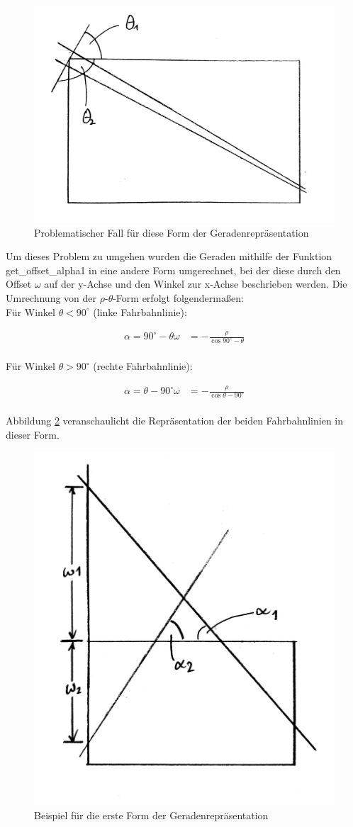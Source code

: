 	
	
	\begin{figure}[H]
		\centering
		\includegraphics[width=.5\linewidth]{images/rho_theta2.jpg}
		\caption{Problematischer Fall für diese Form der Geradenrepräsentation}
		\label{fig:rho_theta2}
	\end{figure}

	Um dieses Problem zu umgehen wurden die Geraden mithilfe der Funktion get\_offset\_alpha1 in eine andere Form umgerechnet, bei der diese durch den Offset $\omega$ auf der y-Achse und den Winkel zur x-Achse beschrieben werden. Die Umrechnung von der $\rho$-$\theta$-Form erfolgt folgendermaßen:\\

	
	
	Für Winkel $\theta<90^\circ$ (linke Fahrbahnlinie):
	
	\begin{align*}
	\alpha=90^{\circ}-\theta
	\omega&=-\frac{\rho}{\cos{90^{\circ}-\theta}} \\
	\end{align*}
	
	Für Winkel $\theta>90^\circ$ (rechte Fahrbahnlinie):
	
	\begin{align*}
	\alpha=\theta-90^{\circ}
	\omega&=-\frac{\rho}{\cos{\theta-90^{\circ}}} \\
	\end{align*}
	
	Abbildung \ref{fig:alpha_omega1} veranschaulicht die Repräsentation der beiden Fahrbahnlinien in dieser Form.
	
	\begin{figure}[H]
		\centering
		\includegraphics[width=.5\linewidth]{images/alpha_omega1.jpg}
		\caption{Beispiel für die erste Form der Geradenrepräsentation}
		\label{fig:alpha_omega1}
	\end{figure}

